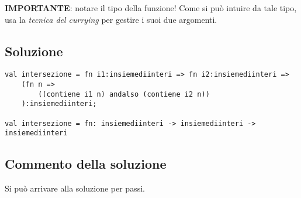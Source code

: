 \textbf{IMPORTANTE}: notare il tipo della funzione! Come si può intuire da tale tipo, usa la \emph{tecnica del currying} per gestire i suoi due argomenti.

\subsection{Soluzione}

\begin{lstlisting}[style = SML, caption = {Definizione della funzione \sml{intersezione}}]
val intersezione = fn i1:insiemediinteri => fn i2:insiemediinteri =>
	(fn n =>
		((contiene i1 n) andalso (contiene i2 n))
	):insiemediinteri;

val intersezione = fn: insiemediinteri -> insiemediinteri -> insiemediinteri
\end{lstlisting}

\subsection{Commento della soluzione}

Si può arrivare alla soluzione per passi.
